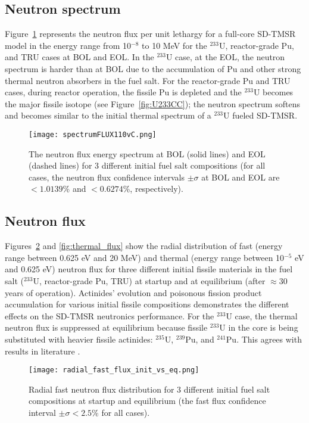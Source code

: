 \subsection{Neutron spectrum}
Figure~\ref{fig:spectrumFLUX110vC} represents the neutron flux per unit 
lethargy for a full-core SD-TMSR model in the energy range from 10$^{-8}$ to 
10 MeV for the $^{233}$U, reactor-grade Pu, and TRU cases at BOL and EOL. In 
the $^{233}$U case, at the EOL, the neutron spectrum is harder than at BOL due 
to the accumulation of Pu and other strong thermal neutron absorbers in the 
fuel salt. For the reactor-grade Pu and TRU cases, during reactor operation, 
the fissile Pu is depleted and the $^{233}$U becomes the major fissile isotope 
(see Figure~\ref{fig:U233CC}); the neutron spectrum softens and becomes 
similar to the initial thermal spectrum of a $^{233}$U fueled \gls{SD-TMSR}.
 \begin{figure}
 	\centering
 	\texttt{[image: spectrumFLUX110vC.png]}
 			\vspace{-0.4in}
 	\caption{The neutron flux energy spectrum at BOL (solid lines) and EOL (dashed lines) for 3 different initial 
 		fuel salt compositions (for all cases, the neutron flux
 		confidence intervals $\pm\sigma$ at BOL and EOL are $<1.0139$\% and $<0.6274$\%, respectively).}
 	\label{fig:spectrumFLUX110vC}
\end{figure}

\subsection{Neutron flux}
Figures~\ref{fig:fast_flux} and \ref{fig:thermal_flux} show the radial 
distribution of fast (energy range between 0.625 eV and 20 MeV) and thermal 
(energy range between 10$^{-5}$ eV and 0.625 eV) neutron flux for three 
different initial fissile materials in the fuel salt ($^{233}$U, reactor-grade 
Pu, TRU) at startup and at equilibrium (after $\approx 30$ years of 
operation). Actinides' evolution and poisonous fission product accumulation 
for various initial fissile compositions demonstrates the different effects on 
the SD-TMSR neutronics performance. For the $^{233}$U case, the thermal 
neutron flux is suppressed at equilibrium because fissile $^{233}$U in the 
core is being substituted with heavier fissile actinides: $^{235}$U, 
$^{239}$Pu, and $^{241}$Pu. This agrees with results in literature 
\cite{rykhlevskii2019modeling, ashraf2019whole_core}.
\begin{figure}[htp!] %
	\texttt{[image: radial\_fast\_flux\_init\_vs\_eq.png]} 
	\caption{Radial fast neutron flux distribution for 3 different initial 
		fuel salt compositions at startup and equilibrium (the fast flux 
		confidence interval $\pm\sigma<2.5$\% for all cases).}
	\label{fig:fast_flux}
\end{figure}

